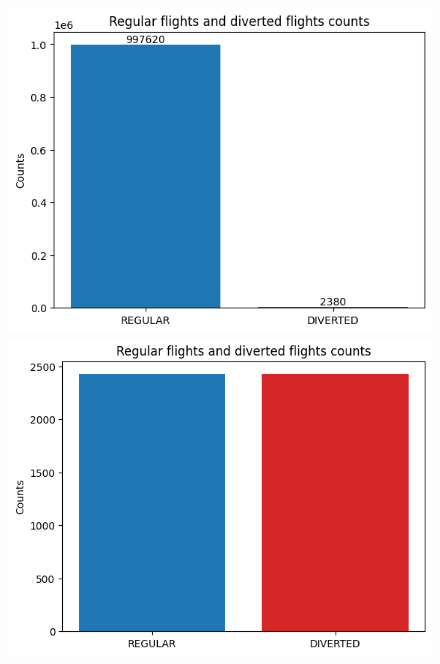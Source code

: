 \documentclass[
	letterpaper, %
	10pt, %
]{class}
\begin{document}
\begin{figure}[!htb]
    \centering
    \includegraphics[width=\linewidth]{../images/diverted_unbalanced.png}
    \endminipage\hfill
    \includegraphics[width=\linewidth]{../images/diverted_balanced.png}
    \endminipage\hfill
\end{figure}
\end{document}
